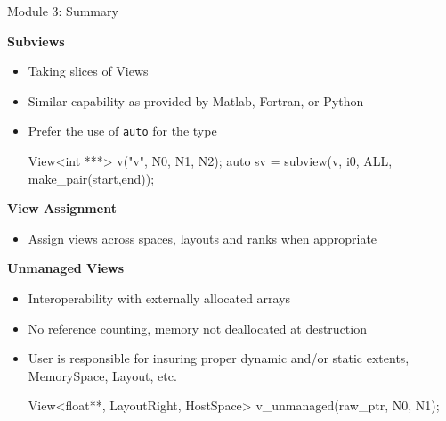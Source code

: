 \begin{frame}[fragile]{Module 3: Summary}

	\textbf{Subviews}
        \begin{itemize}
                \item Taking slices of Views
                \item Similar capability as provided by Matlab, Fortran, or Python
                \item {Prefer the use of \texttt{auto} for the type
\begin{code}[keywords={View,int,subview,ALL,make_pair}]
View<int ***> v("v", N0, N1, N2);
auto sv = subview(v, i0, ALL, make_pair(start,end));
\end{code}}
        \end{itemize}

        \textbf{View Assignment}
        \begin{itemize}
                \item Assign views across spaces, layouts and ranks when appropriate
        \end{itemize}

        \vspace{10pt}
        \textbf{Unmanaged Views}
        \begin{itemize}
                \item Interoperability with externally allocated arrays
                \item No reference counting, memory not deallocated at destruction
                \item { User is responsible for insuring proper dynamic and/or static extents, MemorySpace, Layout, etc.
\begin{code}[keywords={View, float, LayoutRight, HostSpace, MemoryTraits, Unmanaged}]
View<float**, LayoutRight, HostSpace>
  v_unmanaged(raw_ptr, N0, N1);
\end{code}}
        \end{itemize}

\end{frame}

